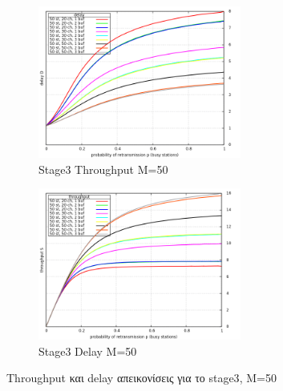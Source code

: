 \documentclass[12pt]{report}
\begin{document}
\begin{figure}[h]
\begin{subfigure}{0.5\textwidth}
\includegraphics[width=0.9\linewidth, height=5cm]{st3_throughput_M50} 
\caption{\textlatin{Stage3 Throughput M=50}}
\label{fig:st3_throughput_50}
\end{subfigure}
\begin{subfigure}{0.5\textwidth}
\includegraphics[width=0.9\linewidth, height=5cm]{st3_delay_M50}
\caption{\textlatin{Stage3 Delay M=50}}
\label{fig:st3_delay_50}
\end{subfigure}
 
\caption{\textlatin{Throughput} και \textlatin{delay} απεικονίσεις για το \textlatin{stage3}, M=50}
\label{fig:Stage3_50}
\end{figure}
\end{document}
